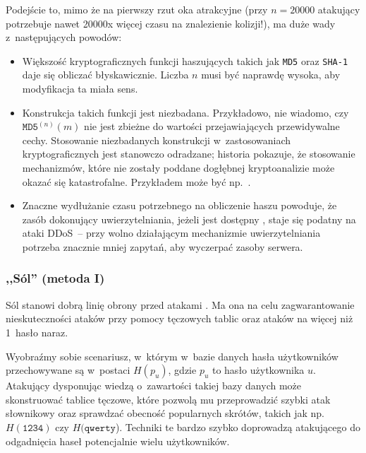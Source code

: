 Podejście to, mimo że na pierwszy rzut oka atrakcyjne (przy $n = 20000$
atakujący potrzebuje nawet 20000x więcej czasu na znalezienie kolizji!), ma
duże wady z~następujących powodów:

\begin{itemize}

\item Większość kryptograficznych funkcji haszujących takich jak \texttt{MD5}
oraz \texttt{SHA-1} daje się obliczać błyskawicznie. Liczba $n$ musi być
naprawdę wysoka, aby modyfikacja ta miała sens.

\item Konstrukcja takich funkcji jest niezbadana. Przykładowo, nie wiadomo, czy
$\mathtt{MD5}^{(n)}(m)$ nie jest zbieżne do wartości przejawiających przewidywalne
cechy. Stosowanie niezbadanych konstrukcji w~zastosowaniach kryptograficznych
jest stanowczo odradzane; historia pokazuje, że stosowanie mechanizmów, które
nie zostały poddane dogłębnej kryptoanalizie może okazać się katastrofalne.
Przykładem może być np.~\cite{untested_cryptography}.

\item Znaczne wydłużanie czasu potrzebnego na obliczenie haszu powoduje, że
zasób dokonujący uwierzytelniania, jeżeli jest dostępny , staje się
podatny na ataki DDoS~-- przy wolno działającym mechanizmie uwierzytelniania
potrzeba znacznie mniej zapytań, aby wyczerpać zasoby serwera.

\end{itemize}

\label{salt_1}%
\subsubsection{,,Sól'' (metoda I)}

Sól stanowi dobrą linię obrony przed atakami . Ma ona na celu
zagwarantowanie nieskuteczności ataków przy pomocy tęczowych tablic oraz ataków
na więcej niż 1~hasło naraz.

Wyobraźmy sobie scenariusz, w~którym w~bazie danych hasła użytkowników
przechowywane są w~postaci $H(p_u)$, gdzie $p_u$ to hasło użytkownika $u$.
Atakujący dysponując wiedzą o~zawartości takiej bazy danych może skonstruować
tablice tęczowe, które pozwolą mu przeprowadzić szybki atak słownikowy oraz
sprawdzać obecność popularnych skrótów, takich jak np. $H(\texttt{1234})$ czy
$H(\texttt{qwerty}$). Techniki te bardzo szybko doprowadzą atakującego do
odgadnięcia haseł potencjalnie wielu użytkowników.

